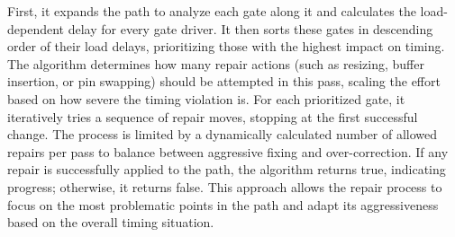 \documentclass[conference]{IEEEtran}
\begin{document}
First, it expands the path to analyze each gate along it and calculates the load-dependent delay for every gate driver. It then sorts these gates in descending order of their load delays, prioritizing those with the highest impact on timing. The algorithm determines how many repair actions (such as resizing, buffer insertion, or pin swapping) should be attempted in this pass, scaling the effort based on how severe the timing violation is. For each prioritized gate, it iteratively tries a sequence of repair moves, stopping at the first successful change. The process is limited by a dynamically calculated number of allowed repairs per pass to balance between aggressive fixing and over-correction. If any repair is successfully applied to the path, the algorithm returns true, indicating progress; otherwise, it returns false. This approach allows the repair process to focus on the most problematic points in the path and adapt its aggressiveness based on the overall timing situation.
\end{document}
